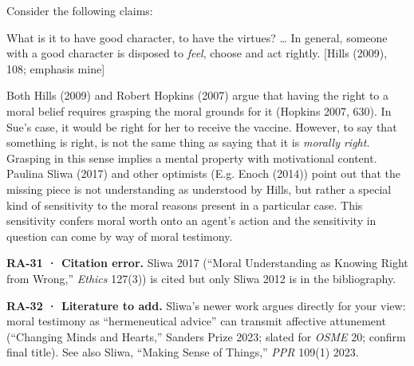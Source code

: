 \documentclass[
  letterpaper,
  DIV=11,
  numbers=noendperiod]{scrartcl}
\theoremstyle{remark}
\begin{document}
Consider the following claims:

What is it to have good character, to have the virtues? \ldots{} In
general, someone with a good character is disposed to \emph{feel},
choose and act rightly. {[}Hills (2009), 108; emphasis mine{]}

Both Hills (2009) and Robert Hopkins (2007) argue that having the right
to a moral belief requires grasping the moral grounds for it (Hopkins
2007, 630). In Sue's case, it would be right for her to receive the
vaccine. However, to say that something is right, is not the same thing
as saying that it is \emph{morally right}. Grasping in this sense
implies a mental property with motivational content. Paulina Sliwa
(2017) and other optimists (E.g. Enoch (2014)) point out that the
missing piece is not understanding as understood by Hills, but rather a
special kind of sensitivity to the moral reasons present in a particular
case. This sensitivity confers moral worth onto an agent's action and
the sensitivity in question can come by way of moral testimony.

\begin{tcolorbox}[enhanced jigsaw, arc=.35mm, bottomrule=.15mm, bottomtitle=1mm, breakable, colback=white, colbacktitle=quarto-callout-warning-color!10!white, colframe=quarto-callout-warning-color-frame, coltitle=black, left=2mm, leftrule=.75mm, opacityback=0, opacitybacktitle=0.6, rightrule=.15mm, title=\textcolor{quarto-callout-warning-color}{\faExclamationTriangle}\hspace{0.5em}{Warning}, titlerule=0mm, toprule=.15mm, toptitle=1mm]

\textbf{RA-31 · Citation error.} Sliwa 2017 (``Moral Understanding as
Knowing Right from Wrong,'' \emph{Ethics} 127(3)) is cited but only
Sliwa 2012 is in the bibliography.

\end{tcolorbox}

\begin{tcolorbox}[enhanced jigsaw, arc=.35mm, bottomrule=.15mm, bottomtitle=1mm, breakable, colback=white, colbacktitle=quarto-callout-tip-color!10!white, colframe=quarto-callout-tip-color-frame, coltitle=black, left=2mm, leftrule=.75mm, opacityback=0, opacitybacktitle=0.6, rightrule=.15mm, title=\textcolor{quarto-callout-tip-color}{\faLightbulb}\hspace{0.5em}{Tip}, titlerule=0mm, toprule=.15mm, toptitle=1mm]

\textbf{RA-32 · Literature to add.} Sliwa's newer work argues directly
for your view: moral testimony as ``hermeneutical advice'' can transmit
affective attunement (``Changing Minds and Hearts,'' Sanders Prize 2023;
slated for \emph{OSME} 20; confirm final title). See also Sliwa,
``Making Sense of Things,'' \emph{PPR} 109(1) 2023.

\end{tcolorbox}
\end{document}
